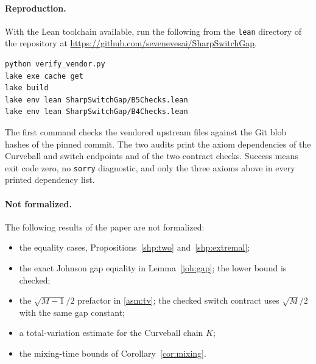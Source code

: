 \paragraph{Reproduction.}
With the Lean toolchain available, run the following from the \texttt{lean}
directory of the repository at \url{https://github.com/sevenevesai/SharpSwitchGap}.
\begin{verbatim}
python verify_vendor.py
lake exe cache get
lake build
lake env lean SharpSwitchGap/B5Checks.lean
lake env lean SharpSwitchGap/B4Checks.lean
\end{verbatim}
The first command checks the vendored upstream files against the Git blob
hashes of the pinned commit. The two audits print the axiom dependencies of
the Curveball and switch endpoints and of the two contract checks. Success
means exit code zero, no \texttt{sorry} diagnostic, and only the three axioms
above in every printed dependency list.

\paragraph{Not formalized.}
The following results of the paper are not formalized:
\begin{itemize}
\item the equality cases, Propositions~\ref{shp:two} and~\ref{shp:extremal};
\item the exact Johnson gap equality in Lemma~\ref{joh:gap}; the lower bound
 is checked;
\item the $\sqrt{M-1}/2$ prefactor in \eqref{asm:tv}; the checked switch
 contract uses $\sqrt M/2$ with the same gap constant;
\item a total-variation estimate for the Curveball chain $K$;
\item the mixing-time bounds of Corollary~\ref{cor:mixing}.
\end{itemize}
